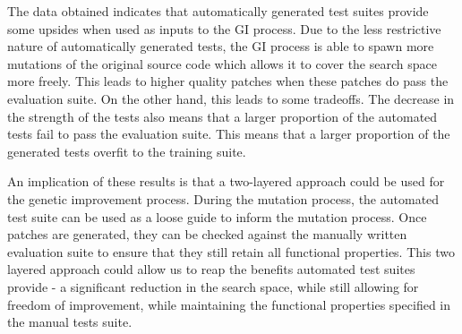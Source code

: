 \documentclass[titlepage]{article}
\begin{document}
\begin{table}[h]
\centering
{}
\caption{Head to head comparision between automated and manual tests used in the study. Taking the mean of all 4 coverage metrics, we see that manual tests had slightly lower average coverage at 88\% compared to that of EvoSuite-generated tests at 90\%. Despite this manual test, suites still managed to produce patches which overfit far less often}
\label{tab:table3}
\end{table}

The data obtained indicates that automatically generated test suites provide some upsides when used as inputs to the GI process. Due to the less restrictive nature of automatically generated tests, the GI process is able to spawn more mutations of the original source code which allows it to cover the search space more freely. This leads to higher quality patches when these patches do pass the evaluation suite. On the other hand, this leads to some tradeoffs. The decrease in the strength of the tests also means that a larger proportion of the automated tests fail to pass the evaluation suite. This means that a larger proportion of the generated tests overfit to the training suite. 

An implication of these results is that a two-layered approach could be used for the genetic improvement process. During the mutation process, the automated test suite can be used as a loose guide to inform the mutation process. Once patches are generated, they can be checked against the manually written evaluation suite to ensure that they still retain all functional properties. This two layered approach could allow us to reap the benefits automated test suites provide - a significant reduction in the search space, while still allowing for freedom of improvement, while maintaining the functional properties specified in the manual tests suite.
\end{document}
